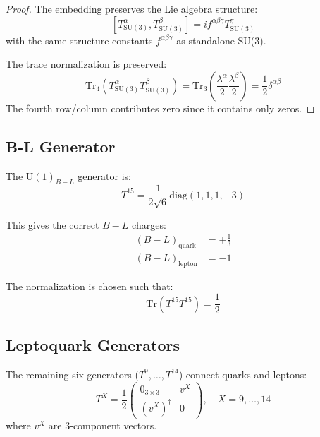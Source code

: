 \documentclass[11pt,a4paper]{article}
\theoremstyle{definition}
\begin{document}
\begin{proof}
The embedding preserves the Lie algebra structure:
\begin{equation}
  \label{eq:embedding-commutator}
  [T^{\alpha}_{\text{SU}(3)}, T^{\beta}_{\text{SU}(3)}] = i f^{\alpha\beta\gamma} T^{\gamma}_{\text{SU}(3)}
\end{equation}
with the same structure constants $f^{\alpha\beta\gamma}$ as standalone SU(3).

The trace normalization is preserved:
\begin{equation}
  \label{eq:embedding-trace}
  \text{Tr}_4(T^{\alpha}_{\text{SU}(3)} T^{\beta}_{\text{SU}(3)})
  = \text{Tr}_3\left(\frac{\lambda^{\alpha}}{2} \frac{\lambda^{\beta}}{2}\right)
  = \frac{1}{2}\delta^{\alpha\beta}
\end{equation}
The fourth row/column contributes zero since it contains only zeros.
\end{proof}

\subsection{B-L Generator}
\label{subsec:bl-generator}

The $\text{U}(1)_{B-L}$ generator is:
\begin{equation}
  \label{eq:bl-generator}
  T^{15} = \frac{1}{2\sqrt{6}} \text{diag}(1, 1, 1, -3)
\end{equation}

This gives the correct $B - L$ charges:
\begin{align}
  \label{eq:bl-charges}
  (B - L)_{\text{quark}} &= +\frac{1}{3} \\
  (B - L)_{\text{lepton}} &= -1
\end{align}

The normalization is chosen such that:
\begin{equation}
  \label{eq:bl-trace}
  \text{Tr}(T^{15} T^{15}) = \frac{1}{2}
\end{equation}

\subsection{Leptoquark Generators}
\label{subsec:leptoquark}

The remaining six generators ($T^9, \ldots, T^{14}$) connect quarks and leptons:
\begin{equation}
  \label{eq:leptoquark-structure}
  T^X = \frac{1}{2} \begin{pmatrix}
    0_{3\times 3} & v^X \\
    (v^X)^{\dagger} & 0
  \end{pmatrix}, \quad X = 9, \ldots, 14
\end{equation}
where $v^X$ are 3-component vectors.
\end{document}

